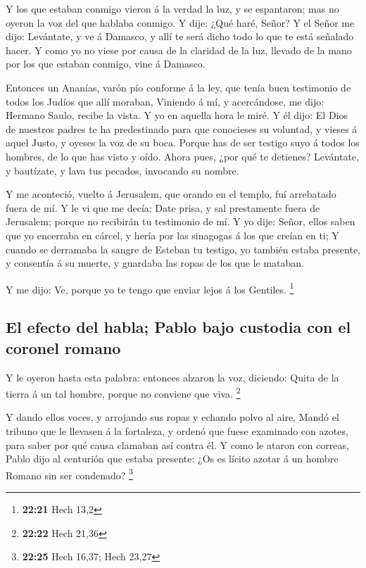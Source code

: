  Y los que estaban conmigo vieron á la verdad la luz, y se
espantaron; mas no oyeron la voz del que hablaba conmigo. 
Y dije: ¿Qué haré, Señor? Y el Señor me dijo: Levántate, y ve á Damasco,
y allí te será dicho todo lo que te está señalado hacer.  Y
como yo no viese por causa de la claridad de la luz, llevado de la mano
por los que estaban conmigo, vine á Damasco.

 Entonces un Ananías, varón pío conforme á la ley, que
tenía buen testimonio de todos los Judíos que allí moraban,
 Viniendo á mí, y acercándose, me dijo: Hermano Saulo,
recibe la vista. Y yo en aquella hora le miré.  Y él dijo:
El Dios de nuestros padres te ha predestinado para que conocieses su
voluntad, y vieses á aquel Justo, y oyeses la voz de su boca.
 Porque has de ser testigo suyo á todos los hombres, de lo
que has visto y oído.  Ahora pues, ¿por qué te detienes?
Levántate, y bautízate, y lava tus pecados, invocando su nombre.

 Y me aconteció, vuelto á Jerusalem, que orando en el
templo, fuí arrebatado fuera de mí.  Y le vi que me decía:
Date prisa, y sal prestamente fuera de Jerusalem; porque no recibirán tu
testimonio de mí.  Y yo dije: Señor, ellos saben que yo
encerraba en cárcel, y hería por las sinagogas á los que creían en ti;
 Y cuando se derramaba la sangre de Esteban tu testigo, yo
también estaba presente, y consentía á su muerte, y guardaba las ropas
de los que le mataban.

 Y me dijo: Ve, porque yo te tengo que enviar lejos á los
Gentiles. \footnote{\textbf{22:21} Hech 13,2}

\hypertarget{el-efecto-del-habla-pablo-bajo-custodia-con-el-coronel-romano}{%
\subsection{El efecto del habla; Pablo bajo custodia con el coronel
romano}\label{el-efecto-del-habla-pablo-bajo-custodia-con-el-coronel-romano}}

 Y le oyeron hasta esta palabra: entonces alzaron la voz,
diciendo: Quita de la tierra á un tal hombre, porque no conviene que
viva. \footnote{\textbf{22:22} Hech 21,36}

 Y dando ellos voces, y arrojando sus ropas y echando polvo
al aire,  Mandó el tribuno que le llevasen á la fortaleza,
y ordenó que fuese examinado con azotes, para saber por qué causa
clamaban así contra él.  Y como le ataron con correas,
Pablo dijo al centurión que estaba presente: ¿Os es lícito azotar á un
hombre Romano sin ser condenado? \footnote{\textbf{22:25} Hech 16,37;
  Hech 23,27}

